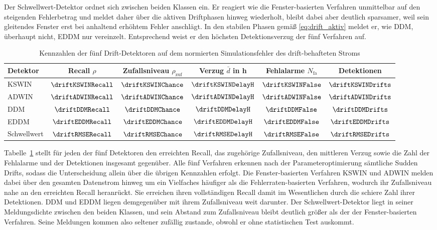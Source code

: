 %
Der Schwellwert-Detektor ordnet sich zwischen beiden Klassen ein. Er reagiert wie die Fenster-basierten Verfahren unmittelbar auf den steigenden Fehlerbetrag und meldet daher über die aktiven Driftphasen hinweg wiederholt, bleibt dabei aber deutlich sparsamer, weil sein gleitendes Fenster erst bei anhaltend erhöhtem Fehler anschlägt. In den stabilen Phasen gemäß \eqref{eq:drift_aktiv} meldet er, wie \ac{DDM}, überhaupt nicht, \ac{EDDM} nur vereinzelt. Entsprechend weist er den höchsten Detektionsverzug der fünf Verfahren auf. \par
%
\begin{table}[tbp]
\centering
\caption{Kennzahlen der fünf Drift-Detektoren auf dem normierten Simulationsfehler des drift-behafteten Stroms}
\label{tab:synthetic_data_detection_stats}
\begin{tabular}{lccccc}
\toprule
\textbf{Detektor} & Recall $\rho$ & Zufallsniveau $\rho_{\mathrm{zuf}}$ & Verzug $\bar{d}$ in \si{\hour} & Fehlalarme $N_{\mathrm{fa}}$ & Detektionen \\
\midrule
\ac{KSWIN} & $\driftKSWINRecall$ & $\driftKSWINChance$ & $\driftKSWINDelayH$ & $\driftKSWINFalse$ & $\driftKSWINDrifts$ \\
\ac{ADWIN} & $\driftADWINRecall$ & $\driftADWINChance$ & $\driftADWINDelayH$ & $\driftADWINFalse$ & $\driftADWINDrifts$ \\
\ac{DDM}   & $\driftDDMRecall$   & $\driftDDMChance$   & $\driftDDMDelayH$   & $\driftDDMFalse$   & $\driftDDMDrifts$   \\
\ac{EDDM}  & $\driftEDDMRecall$  & $\driftEDDMChance$  & $\driftEDDMDelayH$  & $\driftEDDMFalse$  & $\driftEDDMDrifts$  \\
Schwellwert & $\driftRMSERecall$ & $\driftRMSEChance$  & $\driftRMSEDelayH$  & $\driftRMSEFalse$  & $\driftRMSEDrifts$  \\
\bottomrule
\end{tabular}
\end{table}
%
Tabelle~\ref{tab:synthetic_data_detection_stats} stellt für jeden der fünf Detektoren den erreichten Recall, das zugehörige Zufallsniveau, den mittleren Verzug sowie die Zahl der Fehlalarme und der Detektionen insgesamt gegenüber. Alle fünf Verfahren erkennen nach der Parameteroptimierung sämtliche Sudden Drifts, sodass die Unterscheidung allein über die übrigen Kennzahlen erfolgt. Die Fenster-basierten Verfahren \ac{KSWIN} und \ac{ADWIN} melden dabei über den gesamten Datenstrom hinweg um ein Vielfaches häufiger als die Fehlerraten-basierten Verfahren, wodurch ihr Zufallsniveau nahe an den erreichten Recall heranrückt. Sie erreichen ihren vollständigen Recall damit im Wesentlichen durch die schiere Zahl ihrer Detektionen. \ac{DDM} und \ac{EDDM} liegen demgegenüber mit ihrem Zufallsniveau weit darunter. Der Schwellwert-Detektor liegt in seiner Meldungsdichte zwischen den beiden Klassen, und sein Abstand zum Zufallsniveau bleibt deutlich größer als der der Fenster-basierten Verfahren. Seine Meldungen kommen also seltener zufällig zustande, obwohl er ohne statistischen Test auskommt. \par
